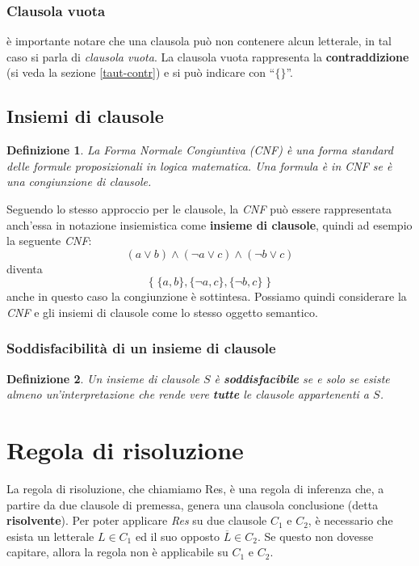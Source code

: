 \documentclass[a4paper,12pt]{report}
\newtheorem{definition}{Definizione}[section]
\begin{document}
\subsubsection{Clausola vuota}
è importante notare che una clausola può non contenere alcun letterale, in tal caso si parla di \emph{clausola vuota}. La clausola vuota rappresenta la \textbf{contraddizione} (si veda la sezione \ref{taut-contr}) e si può indicare con ``$\{ \}$''.

\subsection{Insiemi di clausole}
\begin{definition}
    La Forma Normale Congiuntiva (CNF) è una forma standard delle formule proposizionali in logica matematica. Una formula è in CNF se è una congiunzione di clausole.
\end{definition}
Seguendo lo stesso approccio per le clausole, la \emph{CNF} può essere rappresentata anch'essa in notazione insiemistica come \textbf{insieme di clausole}, quindi ad esempio la seguente \emph{CNF}:
\[ (a \lor b) \land (\lnot a \lor c) \land (\lnot b \lor c) \]
diventa
\[\{ \; \{a, b\}, \{\lnot a, c\}, \{\lnot b, c\} \; \}\]
anche in questo caso la congiunzione è sottintesa. Possiamo quindi considerare la \emph{CNF} e gli insiemi di clausole come lo stesso oggetto semantico.

\subsubsection{Soddisfacibilità di un insieme di clausole}
\begin{definition}
    Un insieme di clausole $S$ è \textbf{soddisfacibile} se e solo se esiste almeno un'interpretazione che rende vere \textbf{tutte} le clausole appartenenti a $S$.
\end{definition}

\section{Regola di risoluzione}
\label{Res}
La regola di risoluzione, che chiamiamo Res, è una regola di inferenza che, a partire da due clausole di premessa, genera una clausola conclusione (detta \textbf{risolvente}). Per poter applicare \emph{Res} su due clausole $C_1$ e $C_2$, è necessario che esista un letterale $L \in C_1$ ed il suo opposto $\overline{L} \in C_2$. Se questo non dovesse capitare, allora la regola non è applicabile su $C_1$ e $C_2$.
\end{document}
